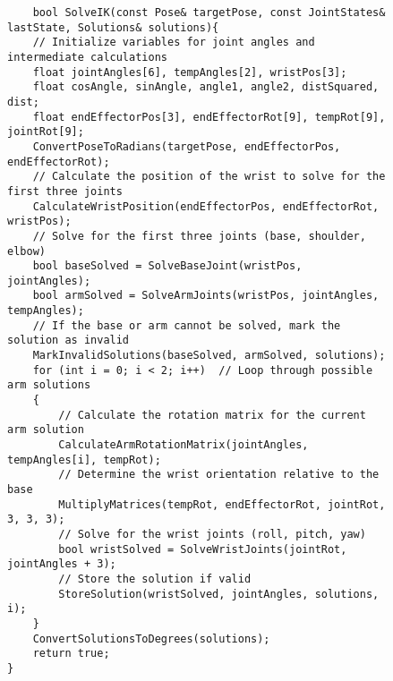 \newpage
{}


\begin{figure}[H]
	\centering
	\begin{verbatim}
	bool SolveIK(const Pose& targetPose, const JointStates& lastState, Solutions& solutions){
    // Initialize variables for joint angles and intermediate calculations
    float jointAngles[6], tempAngles[2], wristPos[3];
    float cosAngle, sinAngle, angle1, angle2, distSquared, dist;
    float endEffectorPos[3], endEffectorRot[9], tempRot[9], jointRot[9];
    ConvertPoseToRadians(targetPose, endEffectorPos, endEffectorRot);
    // Calculate the position of the wrist to solve for the first three joints
    CalculateWristPosition(endEffectorPos, endEffectorRot, wristPos);
    // Solve for the first three joints (base, shoulder, elbow)
    bool baseSolved = SolveBaseJoint(wristPos, jointAngles);
    bool armSolved = SolveArmJoints(wristPos, jointAngles, tempAngles);
    // If the base or arm cannot be solved, mark the solution as invalid
    MarkInvalidSolutions(baseSolved, armSolved, solutions);
    for (int i = 0; i < 2; i++)  // Loop through possible arm solutions
    {
        // Calculate the rotation matrix for the current arm solution
        CalculateArmRotationMatrix(jointAngles, tempAngles[i], tempRot);
        // Determine the wrist orientation relative to the base
        MultiplyMatrices(tempRot, endEffectorRot, jointRot, 3, 3, 3);
        // Solve for the wrist joints (roll, pitch, yaw)
        bool wristSolved = SolveWristJoints(jointRot, jointAngles + 3);
        // Store the solution if valid
        StoreSolution(wristSolved, jointAngles, solutions, i);
    }
    ConvertSolutionsToDegrees(solutions);
    return true; 
}
	\end{verbatim}
\end{figure}


